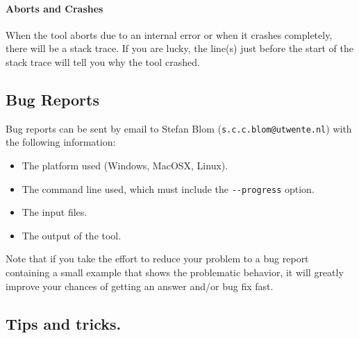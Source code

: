 \paragraph{Aborts and Crashes}

When the tool aborts due to an internal error or when it crashes
completely, there will be
a stack trace. If you are lucky, the line(s) just before the start of the stack trace
will tell you why the tool crashed.

\subsection{Bug Reports}

Bug reports can be sent by email to Stefan Blom (\verb+s.c.c.blom@utwente.nl+) with the following information:
\begin{itemize}
\item The platform used (Windows, MacOSX, Linux).
\item The command line used, which must include the \verb+--progress+ option.
\item The input files.
\item The output of the tool.
\end{itemize}
Note that if you take the effort to reduce your problem to a bug report containing a small example that shows the problematic behavior,
it will greatly improve your chances of getting an answer and/or bug fix fast.

\subsection{Tips and tricks.}

